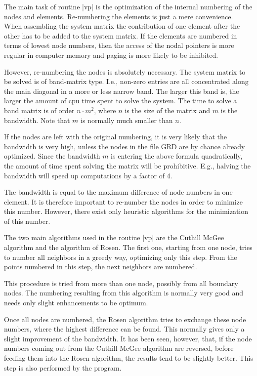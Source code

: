 The main task of routine |vp| is the optimization of the 
internal numbering of the nodes and elements.
Re-numbering the elements is just a mere convenience. When
assembling the system matrix the contribution of
one element after the other has to be added to the system matrix.
If the elements are numbered in terms of lowest node numbers,
then the access of the nodal pointers is more regular in 
computer memory and paging is more likely to be inhibited.

However, re-numbering the nodes is absolutely necessary.
The system matrix to be solved is of band-matrix type.
I.e., non-zero entries are all concentrated along the
main diagonal in a more or less narrow band. The larger this
band is, the larger the amount of cpu time spent to
solve the system. The time to solve a band matrix
is of order $n \cdot m^2$, where $n$ is the size of the
matrix and $m$ is the bandwidth. Note that $m$ is normally
much smaller than $n$.

If the nodes are left with the original numbering, it is very likely
that the bandwidth is very high, unless the nodes in the
file GRD are by chance already optimized. Since the bandwidth $m$
is entering the above formula quadratically, the amount
of time spent solving the matrix will be prohibitive.
E.g., halving the bandwidth will speed up computations by
a factor of 4.

The bandwidth is equal to the maximum difference of node numbers
in one element. It is therefore important to re-number the
nodes in order to minimize this number. However, there exist
only heuristic algorithms for the minimization of this number.

The two main algorithms used in the routine |vp| are
the Cuthill McGee algorithm and the algorithm of Rosen. The first
one, starting from one node, tries to number all neighbors in
a greedy way, optimizing only this step. From the points
numbered in this step, the next neighbors are numbered.

This procedure is tried from more than one node, possibly
from all boundary nodes. The numbering resulting from this
algorithm is normally very good and needs only slight
enhancements to be optimum.

Once all nodes are numbered, the Rosen algorithm tries to
exchange these node numbers, where the highest difference
can be found. This normally gives only a slight improvement
of the bandwidth. It has been seen, however, that, if the
node numbers coming out from the Cuthill McGee algorithm
are reversed, before feeding them into the Rosen algorithm, 
the results tend to be slightly better. This step is also
performed by the program.

